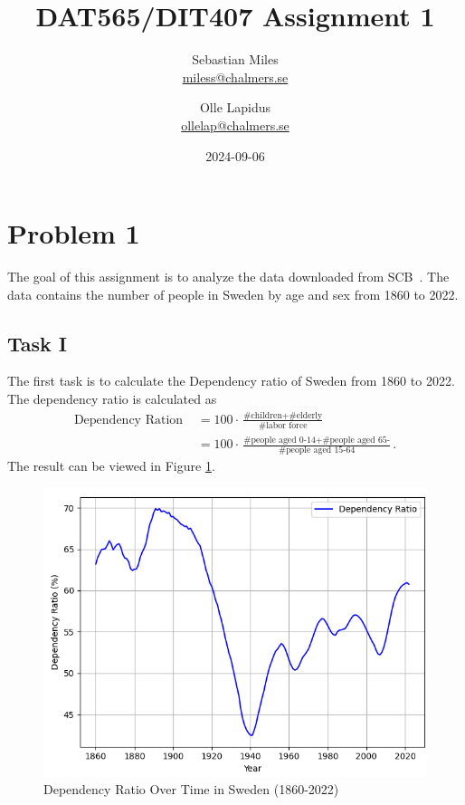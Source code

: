 \documentclass[a4paper]{article}
\begin{document}
\author{
  Sebastian Miles \\
  \href{mailto:miless@chalmers.se}{miless@chalmers.se}
  \and
  Olle Lapidus \\
  \href{mailto:ollelap@chalmers.se}{ollelap@chalmers.se}
}
\title{DAT565/DIT407 Assignment 1}
\date{2024-09-06}

\maketitle

\section*{Problem 1}
The goal of this assignment is to analyze the data downloaded from SCB~\cite{SCB:2023}. The data contains the number of people in Sweden by age and sex from 1860 to 2022. 
\subsection*{Task I}
The first task is to calculate the Dependency ratio of Sweden from 1860 to 2022. The dependency ratio is calculated as
\begin{align*}
\text{Dependency Ration } &= 100\cdot \frac{\text{\#children}+\text{\#elderly}}{\text{\#labor force}}\\
&= 100\cdot \frac{\text{\#people aged 0-14}+\text{\#people aged 65-}}{\text{\#people aged 15-64}}.
\end{align*}
The result can be viewed in Figure \ref{fig:depenratio}.
\begin{figure}[H]
  \begin{center}
    \includegraphics[scale=0.5]{depenratio.png}
    \caption{Dependency Ratio Over Time in Sweden (1860-2022)}
    \label{fig:depenratio}
  \end{center}
\end{figure}
\end{document}
